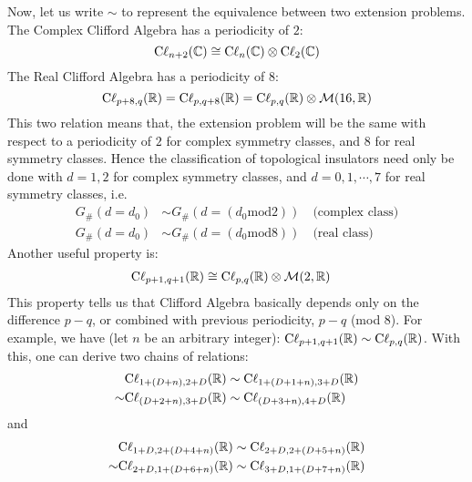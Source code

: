 Now, let us write $\sim$ to represent the equivalence between two extension
problems.  The Complex Clifford Algebra has a periodicity of $2$:
\begin{equation}
    \mathrm{C\ell}_{n+2}(\mathbb{C}) \cong \mathrm{C\ell}_{n}(\mathbb{C})\otimes
    \mathrm{C\ell}_{2}(\mathbb{C})
\end{equation}
The Real Clifford Algebra has a periodicity of $8$:
\begin{equation}
    \mathrm{C\ell}_{p+8,q}(\mathbb{R}) = \mathrm{C\ell}_{p,q+8}(\mathbb{R}) =
    \mathrm{C\ell}_{p,q}(\mathbb{R})\otimes\mathcal{M}(16,\mathbb{R})
\end{equation}
This two relation means that, the extension problem will be the same with respect to
a periodicity of $2$ for complex symmetry classes, and $8$ for real symmetry
classes. Hence the classification of topological insulators need only be done
with $d=1,2$ for complex symmetry classes, and $d=0,1,\cdots,7$ for real
symmetry classes, i.e.
\begin{subequations}
    \label{eq:cli-periodic}
\begin{align}
    G_{\#}(d=d_0) &\sim G_{\#}(d=(d_0 \text{mod} 2)) \quad\text{(complex class)} \\
    G_{\#}(d=d_0) &\sim G_{\#}(d=(d_0 \text{mod} 8)) \quad\text{(real class)}
\end{align}
\end{subequations}
Another useful property is:
\begin{align}
    \mathrm{C\ell}_{p+1,q+1}(\mathbb{R}) &\cong
    \mathrm{C\ell}_{p,q}(\mathbb{R})\otimes\mathcal{M}(2,\mathbb{R})
\end{align}
This property tells us that Clifford Algebra basically depends only on the
difference $p-q$, or combined with previous periodicity, $p-q$ (mod $8$). For
example, we have (let $n$ be an arbitrary integer):
$\mathrm{C\ell}_{p+1,q+1}(\mathbb{R})\sim\mathrm{C\ell}_{p,q}(\mathbb{R})$. With this, one can
derive two chains of relations:
\begin{align}
    &\mathrm{C\ell}_{1+(D+n),2+D}(\mathbb{R}) \sim \mathrm{C\ell}_{1+(D+1+n),3+D}(\mathbb{R})
    \nonumber\\
    \sim & \mathrm{C\ell}_{(D+2+n),3+D}(\mathbb{R}) \sim \mathrm{C\ell}_{(D+3+n),4+D}(\mathbb{R})
\end{align}
and
\begin{align}
    &\mathrm{C\ell}_{1+D,2+(D+4+n)}(\mathbb{R})\sim \mathrm{C\ell}_{2+D,2+(D+5+n)}(\mathbb{R})
    \nonumber\\
    \sim& \mathrm{C\ell}_{2+D,1+(D+6+n)}(\mathbb{R}) \sim
    \mathrm{C\ell}_{3+D,1+(D+7+n)}(\mathbb{R})
\end{align}

